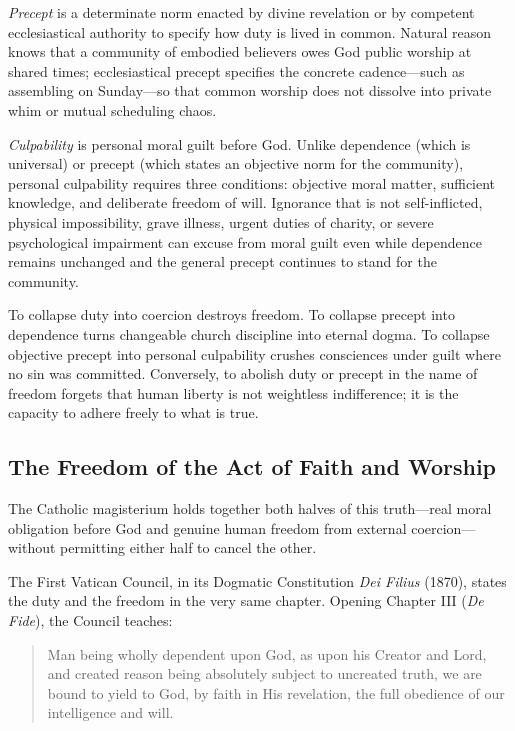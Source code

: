 \emph{Precept} is a determinate norm enacted by divine revelation or by competent ecclesiastical authority to specify how duty is lived in common. Natural reason knows that a community of embodied believers owes God public worship at shared times; ecclesiastical precept specifies the concrete cadence---such as assembling on Sunday---so that common worship does not dissolve into private whim or mutual scheduling chaos.

\emph{Culpability} is personal moral guilt before God. Unlike dependence (which is universal) or precept (which states an objective norm for the community), personal culpability requires three conditions: objective moral matter, sufficient knowledge, and deliberate freedom of will. Ignorance that is not self-inflicted, physical impossibility, grave illness, urgent duties of charity, or severe psychological impairment can excuse from moral guilt even while dependence remains unchanged and the general precept continues to stand for the community.

To collapse duty into coercion destroys freedom. To collapse precept into dependence turns changeable church discipline into eternal dogma. To collapse objective precept into personal culpability crushes consciences under guilt where no sin was committed. Conversely, to abolish duty or precept in the name of freedom forgets that human liberty is not weightless indifference; it is the capacity to adhere freely to what is true.

\subsection{The Freedom of the Act of Faith and Worship}

The Catholic magisterium holds together both halves of this truth---real moral obligation before God and genuine human freedom from external coercion---without permitting either half to cancel the other.

The First Vatican Council, in its Dogmatic Constitution \emph{Dei Filius} (1870), states the duty and the freedom in the very same chapter. Opening Chapter III (\emph{De Fide}), the Council teaches:

\begin{quote}
Man being wholly dependent upon God, as upon his Creator and Lord, and created reason being absolutely subject to uncreated truth, we are bound to yield to God, by faith in His revelation, the full obedience of our intelligence and will.
\end{quote}

